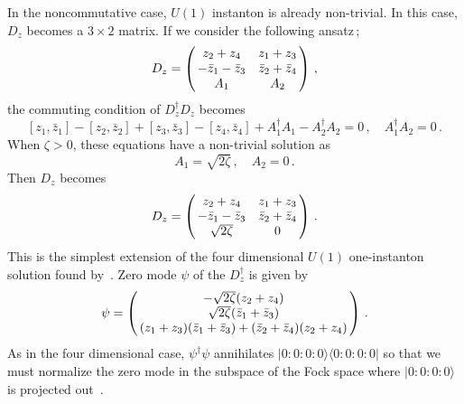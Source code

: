 \documentclass[a4paper,12pt]{article}
\begin{document}
In the noncommutative case, $U(1)$ instanton is already non-trivial.
In this case, $D_z$ becomes a $3\times 2$ matrix.
If we consider the following ansatz\,;
\begin{equation}
D_z = \left( \begin{array}{@{\,}cc@{\,}}
  z_2 +z_4 &  z_1 +z_3\\
   -\bar{z}_1  -\bar{z}_3 & \bar{z}_2+\bar{z}_4\\
  A_1 & A_2
  \end{array}  \right)\,,
\end{equation}
the commuting condition of $D^{\dagger}_zD_z$ becomes
\begin{equation}
\left[ z_1,\bar{z}_1\right]-\left[ z_2,\bar{z}_2\right]
+ \left[ z_3,\bar{z}_3\right]-\left[ z_4,\bar{z}_4\right]
+A_1^{\dagger}A_1 -A_2^{\dagger}A_2=0\,,\quad  A_1^{\dagger}A_2=0\,.
\end{equation}
When $\zeta >0$, these equations have a non-trivial solution as
\begin{equation}
  A_1=\sqrt{2\zeta}\,,\quad A_2=0\,.
\end{equation}
Then $D_{z}$ becomes
\begin{equation}
D_z =
 \left( \begin{array}{@{\,}cc@{\,}}
  z_2 +z_4 &  z_1 +z_3\\
   -\bar{z}_1  -\bar{z}_3 & \bar{z}_2+\bar{z}_4\\
  \sqrt{2\zeta} & 0
  \end{array}  \right)\,.\label{eq:4.21}
\end{equation}
This is the simplest extension of the four dimensional $U(1)$ 
one-instanton solution found by~\cite{ns, furuuchi2}. 
Zero mode $\psi$ of the $D^{\dagger}_z$ is given by
\begin{equation}
\psi =  \left( \begin{array}{@{\,}c@{\,}}
   -\sqrt{2\zeta}(z_2+z_4)  \\
  \sqrt{2\zeta}(\bar{z}_1+\bar{z}_3)   \\
  (z_1+z_3)(\bar{z}_1+\bar{z}_3) +(\bar{z}_2+\bar{z}_4)(z_2+z_4)
  \end{array}  \right)\,.
\end{equation}
As in the four dimensional case, $\psi^{\dagger}\psi$ annihilates 
$|0:0:0:0\rangle\langle 0:0:0:0|$ 
so that we must normalize the zero mode in the subspace of the Fock space 
where $ |0:0:0:0\rangle$ is projected out~\cite{furuuchi, furuuchi2}.
\end{document}
